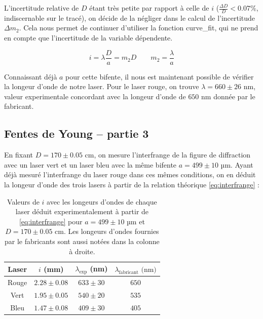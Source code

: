 \documentclass{article}
\begin{document}
L'incertitude relative de $D$ étant très petite par rapport à celle de $i$ ($\frac{\Delta D}{D}<0.07\%$, indiscernable sur le tracé), 
on décide de la négliger dans le calcul de l'incertitude $\Delta m_2$. 
Cela nous permet de continuer d'utiliser la fonction {\color{blue}curve_fit}, 
qui ne prend en compte que l'incertitude de la variable dépendente.

$$i = \lambda \frac{D}{a} = m_2 D \qquad m_2 = \frac{\lambda}{a}$$

Connaissant déjà $a$ pour cette bifente, il nous est maintenant possible de vérifier la longeur d'onde de notre laser. 
Pour le laser rouge, on trouve $\lambda = 660 \pm 26 \textrm{ nm}$, valeur experimentale concordant
avec la longeur d'onde de $650 \textrm{ nm}$ donnée par le fabricant.

\subsection{Fentes de Young – partie 3}

En fixant $D = 170 \pm 0.05 \textrm{ cm}$, on mesure l'interfrange de la figure de diffraction avec un laser vert et un laser bleu avec 
la même bifente $a = 499\pm10 \textrm{ µm}$. Ayant déjà mesuré l'interfrange du laser rouge dans ces mêmes conditions, 
on en déduit la longeur d'onde des trois lasers à partir de la relation théorique \eqref{eq:interfrange} : 

\begin{table}[H]
    \begin{center}
        \begin{tabular}{|c|c|c|c|}
        \hline
        Laser & $i$ (mm) & $\lambda_{\textrm{exp}}$ (nm) & $\lambda_{\textrm{fabricant}} \textrm{ (nm)}$\\
        \hline
        Rouge & $2.28 \pm 0.08$ & $ 633 \pm 30$ & $650$ \\
        Vert & $1.95 \pm 0.05$ & $540 \pm 20$ & $535$ \\
        Bleu & $1.47 \pm 0.08$ & $409 \pm 30$ & $405$ \\
        \hline
    \end{tabular}
    \end{center}
    \caption{Valeurs de $i$ avec les longeurs d'ondes de chaque laser déduit experimentalement à partir de \eqref{eq:interfrange} pour $a = 499\pm10 \textrm{ µm}$ et $D = 170 \pm 0.05 \textrm{ cm}$. 
    Les longeurs d'ondes fournies par le fabricants sont aussi notées dans la colonne à droite.}
\end{table}
\end{document}
